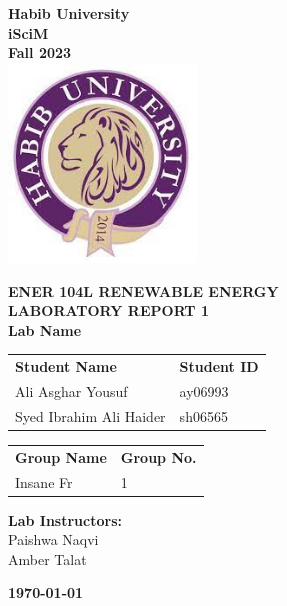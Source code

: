 \documentclass[a4paper, 12pt, english]{article}
\begin{document}
\begin{titlepage}
	\begin{center}
		\textbf{\LARGE Habib University}\\[0.5cm]
		\textbf{\large iSciM}\\[0.2cm]
		\textbf {\large Fall 2023}\\[0.2cm]
		\vspace{20pt}
		\includegraphics[width=5cm]{habiblogo.jpg}\\[1cm]
		\par
		\vspace{20pt}
		\textbf{\Large ENER 104L RENEWABLE ENERGY}\\
		\vspace{15pt}
		\myrule[1pt][7pt]
		\textbf{\LARGE  LABORATORY REPORT 1}\\
		\vspace{15pt}
		\textbf{\large Lab Name}\\
		\myrule[1pt][7pt]
		\vspace{25pt}
		\begin{tabular}{@{}p{5cm}p{3cm}@{}}
			\textbf{\large Student Name} & \textbf{\large Student ID} \\
			Ali Asghar Yousuf            & ay06993                    \\ %
			Syed Ibrahim Ali Haider      & sh06565                    \\ %
		\end{tabular}

		\vspace{10pt}
		\begin{tabular}{@{}p{5cm}p{3cm}@{}}
			\textbf{\large Group Name} & \textbf{\large Group No.} \\
			Insane Fr                  & 1                         \\
		\end{tabular}

		\vspace{45pt}
		\textbf {\large Lab Instructors:}\\[0.2cm]
		\Large {Paishwa Naqvi}\\[0.1cm]
		\Large {Amber Talat}\\[0.1cm]
	\end{center}

	\par
	\vfill
	\begin{center}
		\textbf{\today}\\
	\end{center}

\end{titlepage}
\end{document}
